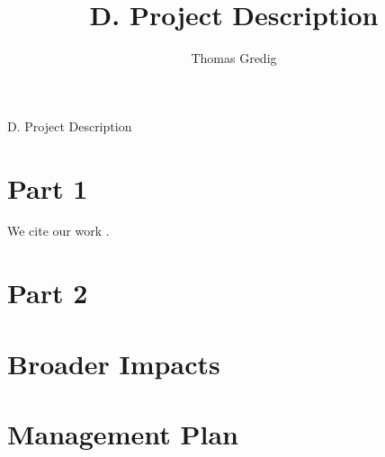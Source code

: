\documentclass{proposal}
\begin{document}

\author{Thomas Gredig}
\title{D. Project Description}
\renewcommand{\thepage} {D--\arabic{page}}
\renewcommand\thesection{\alph{section}.}
\renewcommand\thesubsection{\alph{section}.\arabic{subsection}} %


  \begin{center}\leavevmode
    \normalfont
    { D. Project Description }%
  \end{center}%




\section{Part 1}

\noindent
We cite our work \cite{Nguyen_Synthesis_2020,Bartolome_Molecular_2015,Bartolome_Quadrupolar_2015,Ekstrand_Tunable_2017,Gredig_Height-Height_2013,Tran_Low-temperature_2018,Gredig_Asymmetric_2008}.

\section{Part 2}

\noindent
\lipsum[2]

\section{Broader Impacts} 

\lipsum[3]

\section{ Management Plan }

\lipsum[4]


\clearpage
\setcounter{page}{1}
\renewcommand{\thepage} {E--\arabic{page}}


 
\end{document}
